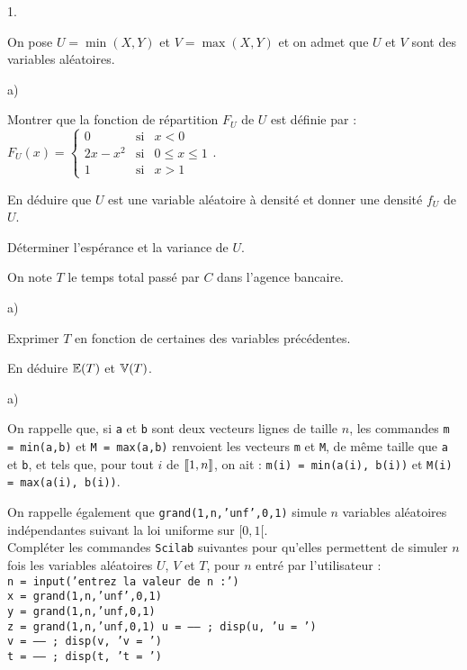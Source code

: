 \documentclass[11pt]{article}%
\begin{document}
\begin{noliste}{1.}
 \setlength{\itemsep}{4mm}
\item On pose $U = \min(X, Y)$ et $V = \max(X, Y)$ et on admet que $U$
et $V$ sont des variables aléatoires.
\begin{noliste}{a)}
 \setlength{\itemsep}{2mm}
\item Montrer que la fonction de répartition $F_{U} $ de $U$ est
définie par : $F_{U} (x) = 
\left\lbrace 
\begin{array}{ccc}
0 & \text{si} & x<0 \\
2x-x^{2} & \text{si} & 0\leq x\leq 1 \\
1 & \text{si} & x>1
\end{array}
\right.$.

\item En déduire que $U$ est une variable aléatoire à densité et donner
une densité $f_{U}$ de $U$.


\item Déterminer l'espérance et la variance de $U$.

\end{noliste}

\item On note $T$ le temps total passé par $C$ dans l'agence bancaire.

\begin{noliste}{a)}
 \setlength{\itemsep}{2mm}
\item Exprimer $T$ en fonction de certaines des variables précédentes.

\item En déduire $\mathbb{E}(T)$ et $\mathbb{V}(T)$.
\end{noliste}

\item 
\begin{noliste}{a)}
 \setlength{\itemsep}{2mm}
\item On rappelle que, si \texttt{a} et \texttt{b} sont deux vecteurs
lignes de taille $n$, les commandes \texttt{m = min(a,b)} et \texttt{M
= max(a,b)} renvoient les vecteurs \texttt{m} et \texttt{M}, de même
taille que \texttt{a} et \texttt{b}, et tels que, pour tout $i$ de
$\llbracket 1, n \rrbracket$, on ait : \texttt{m(i) = min(a(i), b(i))} et
\texttt{M(i) = max(a(i), b(i))}.

\noindent On rappelle également que \texttt{grand(1,n,'unf',0,1)}
simule $n$ variables aléatoires indépendantes suivant la loi uniforme
sur $[0, 1[$. \\
Compléter les commandes \texttt{Scilab} suivantes pour qu'elles
permettent de simuler $n$ fois les variables aléatoires $U$, $V$ et
$T$, pour $n$ entré par l'utilisateur :\\
\texttt{n = input('entrez la valeur de n :')\\
x = grand(1,n,'unf',0,1) \\
y = grand(1,n,'unf,0,1) \\
z = grand(1,n,'unf,0,1)
u = ------ ; disp(u, 'u = ') \\
v = ------ ; disp(v, 'v = ') \\
t = ------ ; disp(t, 't = ')}


\end{noliste}
\end{noliste}
\end{document}
